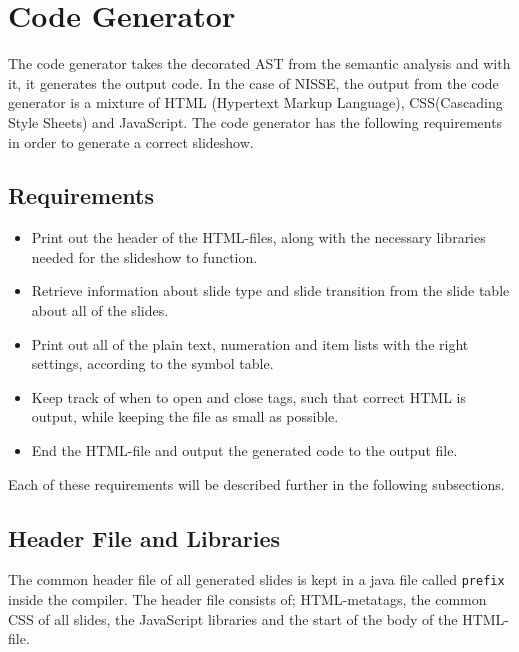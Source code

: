 \chapter{Code Generator}

The code generator takes the decorated AST from the semantic analysis and with it, it generates the output code. In the case of NISSE, the output from the code generator is a mixture of HTML (Hypertext Markup Language), CSS(Cascading Style Sheets) and JavaScript. The code generator has the following requirements in order to generate a correct slideshow.

\section{Requirements}
\begin{itemize}
 \item Print out the header of the HTML-files, along with the necessary libraries needed for the slideshow to function.
 \item Retrieve information about slide type and slide transition from the slide table about all of the slides.
 \item Print out all of the plain text, numeration and item lists with the right settings, according to the symbol table.
 \item Keep track of when to open and close tags, such that correct HTML is output, while keeping the file as small as possible.
 \item End the HTML-file and output the generated code to the output file.
\end{itemize}
Each of these requirements will be described further in the following subsections.

\section{Header File and Libraries}
The common header file of all generated slides is kept in a java file called \texttt{prefix} inside the compiler. The header file consists of; HTML-metatags, the common CSS of all slides, the JavaScript libraries and the start of the body of the HTML-file. \\

 \\

